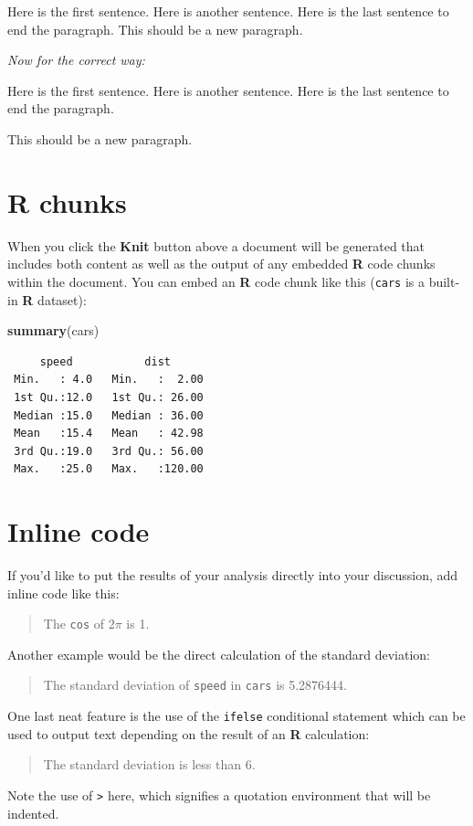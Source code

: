 \documentclass[12pt,twoside]{reedthesis}
\newenvironment{Shaded}{\begin{snugshade}}{\end{snugshade}}
\newcommand{\FunctionTok}[1]{\textcolor[rgb]{0.13,0.29,0.53}{\textbf{#1}}}
\newcommand{\NormalTok}[1]{#1}
\begin{document}
Here is the first sentence. Here is another sentence. Here is the last sentence to end the paragraph.
This should be a new paragraph.

\emph{Now for the correct way:}

Here is the first sentence. Here is another sentence. Here is the last sentence to end the paragraph.

This should be a new paragraph.

\section{R chunks}\label{r-chunks}

When you click the \textbf{Knit} button above a document will be generated that includes both content as well as the output of any embedded \textbf{R} code chunks within the document. You can embed an \textbf{R} code chunk like this (\texttt{cars} is a built-in \textbf{R} dataset):
\begin{Shaded}
\begin{Highlighting}[]
\FunctionTok{summary}\NormalTok{(cars)}
\end{Highlighting}
\end{Shaded}
\begin{verbatim}
     speed           dist       
 Min.   : 4.0   Min.   :  2.00  
 1st Qu.:12.0   1st Qu.: 26.00  
 Median :15.0   Median : 36.00  
 Mean   :15.4   Mean   : 42.98  
 3rd Qu.:19.0   3rd Qu.: 56.00  
 Max.   :25.0   Max.   :120.00  
\end{verbatim}
\section{Inline code}\label{inline-code}

If you'd like to put the results of your analysis directly into your discussion, add inline code like this:
\begin{quote}
The \texttt{cos} of \(2 \pi\) is 1.
\end{quote}
Another example would be the direct calculation of the standard deviation:
\begin{quote}
The standard deviation of \texttt{speed} in \texttt{cars} is 5.2876444.
\end{quote}
One last neat feature is the use of the \texttt{ifelse} conditional statement which can be used to output text depending on the result of an \textbf{R} calculation:
\begin{quote}
The standard deviation is less than 6.
\end{quote}
Note the use of \texttt{\textgreater{}} here, which signifies a quotation environment that will be indented.
\end{document}
